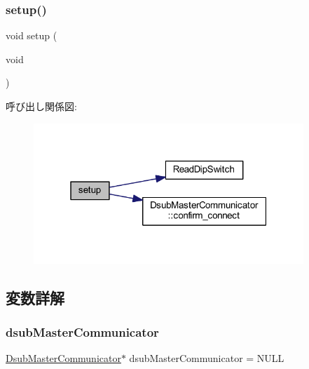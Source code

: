 \subsubsection{\texorpdfstring{setup()}{setup()}}
{\footnotesize\ttfamily void setup (\begin{DoxyParamCaption}\item[{void}]{ }\end{DoxyParamCaption})}

呼び出し関係図\+:\nopagebreak
\begin{figure}[H]
\begin{center}
\leavevmode
\includegraphics[width=289pt]{start__module_8ino_a7dfd9b79bc5a37d7df40207afbc5431f_cgraph}
\end{center}
\end{figure}


\subsection{変数詳解}
\mbox{\label{start__module_8ino_af3e70438e0875f19cc1cb4cb9f522f80}} 
\subsubsection{\texorpdfstring{dsubMasterCommunicator}{dsubMasterCommunicator}}
{\footnotesize\ttfamily \mbox{\hyperlink{class_dsub_master_communicator}{Dsub\+Master\+Communicator}}$\ast$ dsub\+Master\+Communicator = N\+U\+LL}

\mbox{\label{start__module_8ino_a432be7f3eee18ba7ccdf2ab1d8908ae1}} 
